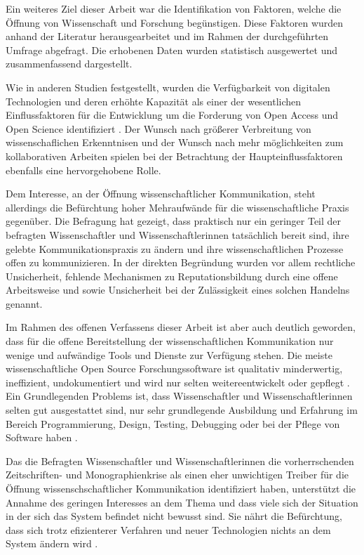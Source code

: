 Ein weiteres Ziel dieser Arbeit war die Identifikation von Faktoren, welche die Öffnung von Wissenschaft und Forschung begünstigen. Diese Faktoren wurden anhand der Literatur herausgearbeitet und im Rahmen der durchgeführten Umfrage abgefragt. Die erhobenen Daten wurden statistisch ausgewertet und zusammenfassend dargestellt.

Wie in anderen Studien festgestellt, wurden die Verfügbarkeit von digitalen Technologien und deren erhöhte Kapazität als einer der wesentlichen Einflussfaktoren für die Entwicklung um die Forderung von Open Access und Open Science identifiziert \cite{eu_open_science_2015}. Der Wunsch nach größerer Verbreitung von wissenschaflichen Erkenntnisen und der Wunsch nach mehr möglichkeiten zum kollaborativen Arbeiten spielen bei der Betrachtung der Haupteinflussfaktoren ebenfalls eine hervorgehobene Rolle.

Dem Interesse, an der Öffnung wissenschaftlicher Kommunikation, steht allerdings die Befürchtung hoher Mehraufwände für die wissenschaftliche Praxis gegenüber. Die Befragung hat gezeigt, dass praktisch nur ein geringer Teil der befragten Wissenschaftler und Wissenschaftlerinnen tatsächlich bereit sind, ihre gelebte Kommunikationspraxis zu ändern und ihre wissenschaftlichen Prozesse offen zu kommunizieren. In der direkten Begründung wurden vor allem rechtliche Unsicherheit, fehlende Mechanismen zu Reputationsbildung durch eine offene Arbeitsweise und sowie Unsicherheit bei der Zulässigkeit eines solchen Handelns genannt.

Im Rahmen des offenen Verfassens dieser Arbeit ist aber auch deutlich geworden, dass für die offene Bereitstellung der wissenschaftlichen Kommunikation nur wenige und aufwändige Tools und Dienste zur Verfügung stehen. Die meiste wissenschaftliche Open Source Forschungssoftware ist qualitativ minderwertig, ineffizient, undokumentiert und wird nur selten weitereentwickelt oder gepflegt \cite{hey_2015_open}. Ein Grundlegenden Problems ist, dass Wissenschaftler und Wissenschaftlerinnen selten gut ausgestattet sind, nur sehr grundlegende Ausbildung und Erfahrung im Bereich Programmierung, Design, Testing, Debugging oder bei der Pflege von Software haben \cite{hey_2015_open}.

Das die Befragten Wissenschaftler und Wissenschaftlerinnen die vorherrschenden Zeitschriften- und Monographienkrise als einen eher unwichtigen Treiber für die Öffnung wissenschschaftlicher Kommunikation identifiziert haben, unterstützt die Annahme des geringen Interesses an dem Thema und dass viele sich der Situation in der sich das System befindet nicht bewusst sind. Sie nährt die Befürchtung, dass sich trotz efizienterer Verfahren und neuer Technologien nichts an dem System ändern wird \cite{Parks_2002_acadamic_faust}.

